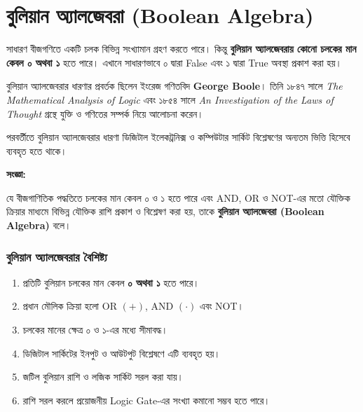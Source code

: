 
\section{বুলিয়ান অ্যালজেবরা
(\textenglish{Boolean Algebra})}

সাধারণ বীজগণিতে একটি চলক বিভিন্ন সংখ্যামান গ্রহণ করতে পারে।
কিন্তু \textbf{বুলিয়ান অ্যালজেবরায় কোনো চলকের মান কেবল ০ অথবা ১}
হতে পারে। এখানে সাধারণভাবে ০ দ্বারা
\textenglish{False} এবং ১ দ্বারা
\textenglish{True} অবস্থা প্রকাশ করা হয়।

বুলিয়ান অ্যালজেবরার ধারণার প্রবর্তক ছিলেন ইংরেজ গণিতবিদ
\textbf{\textenglish{George Boole}}।
তিনি ১৮৪৭ সালে
\textit{\textenglish{The Mathematical Analysis of Logic}}
এবং ১৮৫৪ সালে
\textit{\textenglish{An Investigation of the Laws of Thought}}
গ্রন্থে যুক্তি ও গণিতের সম্পর্ক নিয়ে আলোচনা করেন।

পরবর্তীতে বুলিয়ান অ্যালজেবরার ধারণা ডিজিটাল ইলেকট্রনিক্স
ও কম্পিউটার সার্কিট বিশ্লেষণের অন্যতম ভিত্তি হিসেবে ব্যবহৃত হতে থাকে।

\par\begingroup

\textbf{সংজ্ঞা:}

যে বীজগাণিতিক পদ্ধতিতে চলকের মান কেবল ০ ও ১ হতে পারে
এবং \textenglish{AND}, \textenglish{OR} ও
\textenglish{NOT}-এর মতো যৌক্তিক ক্রিয়ার মাধ্যমে
বিভিন্ন যৌক্তিক রাশি প্রকাশ ও বিশ্লেষণ করা হয়,
তাকে \textbf{বুলিয়ান অ্যালজেবরা
(\textenglish{Boolean Algebra})} বলে।
\par\endgroup



\subsubsection*{বুলিয়ান অ্যালজেবরার বৈশিষ্ট্য}

\begin{enumerate}[leftmargin=*,itemsep=2pt]
    \item প্রতিটি বুলিয়ান চলকের মান কেবল \textbf{০ অথবা ১} হতে পারে।

    \item প্রধান মৌলিক ক্রিয়া হলো
    \textenglish{OR} \((+)\),
    \textenglish{AND} \((\cdot)\) এবং
    \textenglish{NOT}।

    \item চলকের মানের ক্ষেত্র ০ ও ১-এর মধ্যে সীমাবদ্ধ।

    \item ডিজিটাল সার্কিটের ইনপুট ও আউটপুট বিশ্লেষণে
    এটি ব্যবহৃত হয়।

    \item জটিল বুলিয়ান রাশি ও লজিক সার্কিট সরল করা যায়।

    \item রাশি সরল করলে প্রয়োজনীয়
    \textenglish{Logic Gate}-এর সংখ্যা কমানো সম্ভব হতে পারে।
\end{enumerate}

